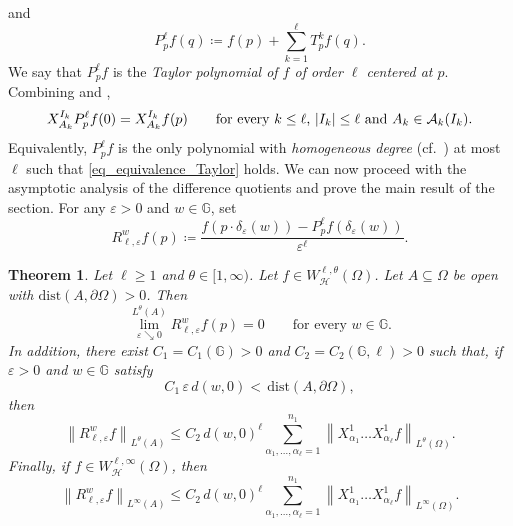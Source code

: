 \documentclass[11pt]{amsart}
\newcommand{\hhh}{{\mathcal{H}}}
\newcommand{\Om}{\Omega}
\newcommand{\eps}{\varepsilon}
\DeclarePairedDelimiter{\abs}{\lvert}{\rvert}
\theoremstyle{plain}
\newtheorem{theorem}{Theorem}[section]
\theoremstyle{definition}
\theoremstyle{remark}
\numberwithin{equation}{section}
\begin{document}
and
\begin{equation} \label{eq_Taylor_polynomial}
P^\ell_p f(q) \coloneqq f(p)+\sum_{k=1}^\ell T^k_p f(q).
\end{equation}
We say that $P^\ell_p f$ is the \emph{Taylor polynomial of $f$ of order $\ell$ centered at $p$}. Combining \cite[Corollary 20.2.10]{BonLanUgu} and \cite[Proposition 20.3.15]{BonLanUgu},
\begin{equation} \label{eq_equivalence_Taylor}
X^{I_k}_{A_k} P^\ell_p f(0) = X^{I_k}_{A_k} f(p) \qquad \text{for every $k \leq \ell$, $\abs*{I_k} \leq \ell$ and $A_k \in \mathcal A_k(I_k)$.}
\end{equation}
Equivalently, $P^\ell_p f$ is the only polynomial with \emph{homogeneous degree} (cf.~\cite{MR0657581,BonLanUgu}) at most $\ell$ such that \eqref{eq_equivalence_Taylor} holds. We can now proceed with the asymptotic analysis of the difference quotients and prove the main result of the section. For any $\eps>0$ and $w \in \mathbb{G}$, set
\begin{equation} \label{eq_difference_quotients_notation}
    R^w_{\ell,\eps} f(p) \coloneqq \frac{f\left(p\cdot\delta_\eps(w)\right)-P^\ell_p f\left(\delta_\eps(w)\right)}{\eps^\ell}.
\end{equation}
\begin{theorem} \label{thm_difference_quotients}
Let $\ell \geq 1$ and $\theta \in [1,\infty)$. Let $f \in W_\hhh^{\ell,\theta}(\Omega)$. Let $A\subseteq\Om$ be open with $\mathrm{dist}(A,\partial\Om)>0$. Then
\begin{equation}\label{eq:priori10_lavorocarnot}
\lim_{\eps \searrow 0}^{L^\theta(A)}  R^w_{\ell,\eps} f(p) = 0\qquad\text{for every $w \in \mathbb G$.}
\end{equation}
In addition, there exist $C_1=C_1(\mathbb G)>0$ and $C_2=C_2(\mathbb G,\ell)>0$ such that, if $\varepsilon>0$ and $w\in\mathbb G$ satisfy 
\begin{equation}\label{condepsw_lavorocarnot}
C_1\,\varepsilon \,d(w,0)<\,\mathrm{dist}(A,\partial\Om),
\end{equation}
then
\begin{equation}\label{eq:priori11_lavorocarnot}
   \left\| R^w_{\ell,\eps}f\right\|_{L^\theta(A)}\leq C_2\, d(w,0)^\ell\sum_{\alpha_1,\ldots,\alpha_\ell=1}^{n_1} \left\|X^1_{\alpha_1}\ldots X^1_{\alpha_\ell}f \right\|_{L^\theta(\Om)}.
\end{equation}
Finally, if $f\in W^{\ell,\infty}_\hhh(\Om)$, then 
\begin{equation}\label{eq:priori11_infinito_lavorocarnot}
   \left\| R^w_{\ell,\eps}f\right\|_{L^\infty(A)}\leq C_2\, d(w,0)^\ell\sum_{\alpha_1,\ldots,\alpha_\ell=1}^{n_1} \left\|X^1_{\alpha_1}\ldots X^1_{\alpha_\ell}f \right\|_{L^\infty(\Om)}.
\end{equation}
\end{theorem}
\end{document}
